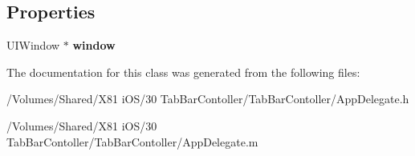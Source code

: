 \subsection*{Properties}
\begin{DoxyCompactItemize}
\item 
\hypertarget{interface_app_delegate_acf48ac24125e688cac1a85445cd7fac2}{U\-I\-Window $\ast$ {\bfseries window}}\label{interface_app_delegate_acf48ac24125e688cac1a85445cd7fac2}

\end{DoxyCompactItemize}


The documentation for this class was generated from the following files\-:\begin{DoxyCompactItemize}
\item 
/\-Volumes/\-Shared/\-X81 i\-O\-S/30 Tab\-Bar\-Contoller/\-Tab\-Bar\-Contoller/App\-Delegate.\-h\item 
/\-Volumes/\-Shared/\-X81 i\-O\-S/30 Tab\-Bar\-Contoller/\-Tab\-Bar\-Contoller/App\-Delegate.\-m\end{DoxyCompactItemize}
